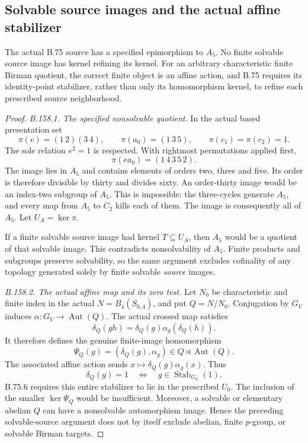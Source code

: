 \subsection*{Solvable source images and the actual affine stabilizer}
\label{stmt:B158}
The actual B.75 source has a specified epimorphism to \(A_5\).
No finite solvable source image has kernel refining its kernel.
For an arbitrary characteristic finite Birman quotient, the
correct finite object is an affine action, and B.75 requires
its identity-point stabilizer, rather than only its homomorphism
kernel, to refine each prescribed source neighborhood.

\begin{proof}
\emph{B.158.1. The specified nonsolvable quotient.}
In the actual based presentation set
\[
 \pi(e)=(1\,2)(3\,4),\qquad
 \pi(a_0)=(1\,3\,5),\qquad
 \pi(c_1)=\pi(c_2)=1.
\]
The sole relation \(e^2=1\) is respected. With rightmost
permutations applied first,
\[
 \pi(ea_0)=(1\,4\,3\,5\,2).
\]
The image lies in \(A_5\) and contains elements of orders two,
three and five. Its order is therefore divisible by thirty and
divides sixty. An order-thirty image would be an index-two
subgroup of \(A_5\). This is impossible: the three-cycles
generate \(A_5\), and every map from \(A_5\) to \(C_2\) kills
each of them. The image is consequently all of \(A_5\).
Let \(U_A=\ker\pi\).

If a finite solvable source image had kernel \(T\subseteq U_A\),
then \(A_5\) would be a quotient of that solvable image. This
contradicts nonsolvability of \(A_5\). Finite products and
subgroups preserve solvability, so the same argument excludes
cofinality of any topology generated solely by finite solvable
\emph{source} images.

\emph{B.158.2. The actual affine map and its zero test.}
Let \(N_0\) be characteristic and finite index in the actual
\(N=B_4(S_{0,4})\), and put \(Q=N/N_0\). Conjugation by
\(G_V\) induces \(\alpha:G_V\to\operatorname{Aut}(Q)\).
The actual crossed map satisfies
\[
 \delta_Q(gh)=\delta_Q(g)\alpha_g(\delta_Q(h)).
\]
It therefore defines the genuine finite-image homomorphism
\[
 \Psi_Q(g)=(\delta_Q(g),\alpha_g)
       \in Q\rtimes\operatorname{Aut}(Q).
\]
The associated affine action sends
\(x\mapsto\delta_Q(g)\alpha_g(x)\). Thus
\[
 \delta_Q(g)=1
 \quad\Longleftrightarrow\quad
 g\in\operatorname{Stab}_{G_V}(1).
\]
B.75.6 requires this entire stabilizer to lie in the prescribed
\(U_0\). The inclusion of the smaller \(\ker\Psi_Q\) would
be insufficient. Moreover, a solvable or elementary abelian
\(Q\) can have a nonsolvable automorphism image. Hence the
preceding solvable-source argument does not by itself exclude
abelian, finite \(p\)-group, or solvable Birman targets.


\end{proof}
